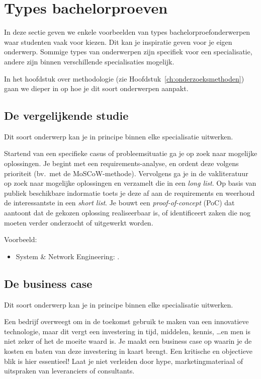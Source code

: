 \section{Types bachelorproeven}%
\label{sec:onderwerp_types}

In deze sectie geven we enkele voorbeelden van types bachelorproefonderwerpen waar studenten vaak voor kiezen. Dit kan je inspiratie geven voor je eigen onderwerp. Sommige types van onderwerpen zijn specifiek voor een specialisatie, andere zijn binnen verschillende specialisaties mogelijk.

In het hoofdstuk over methodologie (zie Hoofdstuk~\ref{ch:onderzoeksmethoden}) gaan we dieper in op hoe je dit soort onderwerpen aanpakt.


\subsection{De vergelijkende studie}%
\label{ssec:onderwerp_types_vergelijkende_studie}

Dit soort onderwerp kan je in principe binnen elke specialisatie uitwerken.

Startend van een specifieke casus of probleemsituatie ga je op zoek naar mogelijke oplossingen. Je begint met een requirements-analyse, en ordent deze volgens prioriteit (bv.\ met de MoSCoW-methode). Vervolgens ga je in de vakliteratuur op zoek naar mogelijke oplossingen en verzamelt die in een \emph{long list}. Op basis van publiek beschikbare indormatie toets je deze af aan de requirements en weerhoud de interessantste in een \emph{short list}. Je bouwt een \emph{proof-of-concept} (PoC) dat aantoont dat de gekozen oplossing realiseerbaar is, of identificeert zaken die nog moeten verder onderzocht of uitgewerkt worden.

Voorbeeld:

\begin{itemize}
  \item  System \& Network Engineering:  \autocite{VanDamme2021}.
\end{itemize}

\subsection{De business case}%
\label{ssec:onderwerp_types_business_case}

Dit soort onderwerp kan je in principe binnen elke specialisatie uitwerken.

Een bedrijf overweegt om in de toekomst gebruik te maken van een innovatieve technologie, maar dit vergt een investering in tijd, middelen, kennis, \ldots en men is niet zeker of het de moeite waard is. Je maakt een business case op waarin je de kosten en baten van deze investering in kaart brengt. Een kritische en objectieve blik is hier essentieel! Laat je niet verleiden door hype, marketingmateriaal of uitspraken van leveranciers of consultants.

